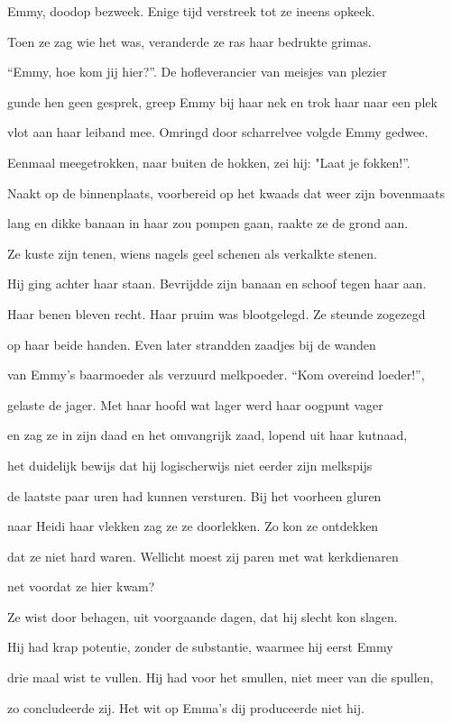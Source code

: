 Emmy, doodop bezweek.
Enige tijd verstreek
tot ze ineens opkeek.

Toen ze zag wie het was,
veranderde ze ras
haar bedrukte grimas.

“Emmy, hoe kom jij hier?”.
De hofleverancier
van meisjes van plezier

gunde hen geen gesprek,
greep Emmy bij haar nek
en trok haar naar een plek

vlot aan haar leiband mee.
Omringd door scharrelvee
volgde Emmy gedwee.

Eenmaal meegetrokken,
naar buiten de hokken,
zei hij: "Laat je fokken!”.

Naakt op de binnenplaats,
voorbereid op het kwaads
dat weer zijn bovenmaats

lang en dikke banaan
in haar zou pompen gaan,
raakte ze de grond aan.

Ze kuste zijn tenen,
wiens nagels geel schenen
als verkalkte stenen.

Hij ging achter haar staan.
Bevrijdde zijn banaan
en schoof tegen haar aan.

Haar benen bleven recht.
Haar pruim was blootgelegd.
Ze steunde zogezegd

op haar beide handen.
Even later strandden
zaadjes bij de wanden

van Emmy’s baarmoeder
als verzuurd melkpoeder.
“Kom overeind loeder!”,

gelaste de jager.
Met haar hoofd wat lager
werd haar oogpunt vager

en zag ze in zijn daad
en het omvangrijk zaad,
lopend uit haar kutnaad,

het duidelijk bewijs
dat hij logischerwijs
niet eerder zijn melkspijs

de laatste paar uren
had kunnen versturen.
Bij het voorheen gluren

naar Heidi haar vlekken
zag ze ze doorlekken.
Zo kon ze ontdekken

dat ze niet hard waren.
Wellicht moest zij paren
met wat kerkdienaren

net voordat ze hier kwam?

Ze wist door behagen,
uit voorgaande dagen,
dat hij slecht kon slagen.

Hij had krap potentie,
zonder de substantie,
waarmee hij eerst Emmy

drie maal wist te vullen.
Hij had voor het smullen,
niet meer van die spullen,

zo concludeerde zij.
Het wit op Emma’s dij
produceerde niet hij.

